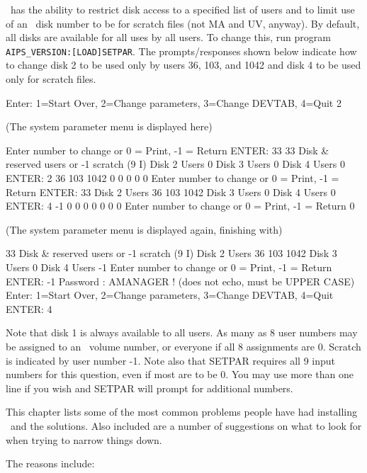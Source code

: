 \medskip{}

\aips\ has the ability to restrict disk access to a
specified list of users and to limit use of an \aips\ disk number to be
for scratch files (not MA and UV, anyway).  By default, all disks are
available for all uses by all users.  To change this, run program
{\tt AIPS\_VERSION:[LOAD]SETPAR}.  The prompts/responses shown below indicate
how to change disk 2 to be used only by users 36, 103, and 1042 and
disk 4 to be used only for scratch files.\medskip

\fortran
Enter:  1=Start Over, 2=Change parameters, 3=Change DEVTAB, 4=Quit
2

(The system parameter menu is displayed here)

Enter number to change or  0 = Print, -1 = Return
ENTER: 33
33  Disk & reserved users or -1 scratch (9 I)
    Disk  2 Users    0
    Disk  3 Users    0
    Disk  4 Users    0
ENTER: 2 36 103 1042 0 0 0 0 0
Enter number to change or  0 = Print, -1 = Return
ENTER: 33
    Disk  2 Users   36  103 1042
    Disk  3 Users    0
    Disk  4 Users    0
ENTER: 4 -1 0 0 0 0 0 0 0
Enter number to change or  0 = Print, -1 = Return
0

(The system parameter menu is displayed again, finishing with)

33  Disk & reserved users or -1 scratch (9 I)
    Disk  2 Users   36  103 1042
    Disk  3 Users    0
    Disk  4 Users   -1
Enter number to change or  0 = Print, -1 = Return
ENTER: -1
Password : AMANAGER     ! (does not echo, must be UPPER CASE)
Enter:  1=Start Over, 2=Change parameters, 3=Change DEVTAB, 4=Quit
ENTER: 4
\endfortran\medskip

\noindent
Note that disk 1 is always available to all users.  As many as 8 user
numbers may be assigned to an \aips\ volume number, or everyone if all 8
assignments are 0.  Scratch is indicated by user number -1.  Note also
that SETPAR requires all 9 input numbers for this question, even if
most are to be 0.  You may use more than one line if you wish and
SETPAR will prompt for additional numbers.

\bigskip
{}

This chapter lists some of the most common problems people have had
installing \aips\ and the solutions.  Also included are a number of
suggestions on what to look for when trying to narrow things down.

\medskip{}

The reasons include:\medskip

